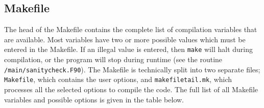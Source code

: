 \documentclass[a4paper]{article}
\newcommand{\var}[1]{\texttt{#1}}
\begin{document}
\newpage




\subsection{Makefile} \label{SS:MAKEFILE}
The head of the Makefile contains the complete list of compilation variables that are available.  Most variables have two or more possible values which must be entered in the Makefile.  If an illegal value is entered, then \var{make} will halt during compilation, or the program will stop during runtime (see the routine \var{/main/sanitycheck.F90}).  The Makefile is technically split into two separate files; \var{Makefile}, which contains the user options, and \var{makefiletail.mk}, which processes all the selected options to compile the code.  The full list of all Makefile variables and possible options is given in the table below. 
\newline

\end{document}
